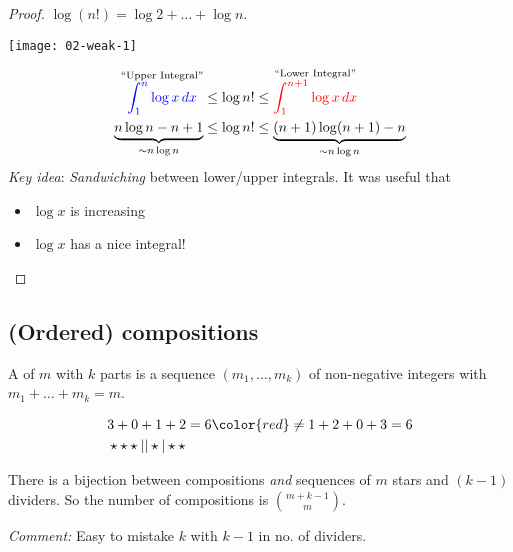 \begin{proof}
    $\log(n!) = \log 2 + \dots + \log n$.
    {\par \centering \texttt{[image: 02-weak-1]} \par}
    \begin{align*}
        \overset{``\text{Upper Integral}"}{\mathcolor{blue}{\int_{1}^{n} \log x \,dx}} \leq \log n! &\leq \overset{``\text{Lower Integral}"}{\mathcolor{red}{\int_{1}^{n + 1} \log x \,dx}} \\
        \underbrace{n \log n - n + 1}_{\sim n \log n} \leq \log n! &\leq \underbrace{(n + 1)\log(n+1) - n}_{\sim n \log n}
    \end{align*} 
    \emph{Key idea}: \emph{Sandwiching} between lower/upper integrals. It was useful that
    \begin{itemize}
        \item $\log x$ is increasing
        \item $\log x$ has a nice integral!
    \end{itemize} 
\end{proof}

\subsection{(Ordered) compositions} \label{Ordered compositions}

\begin{definition}[Composition]
    A  of $m$ with $k$ parts is a sequence $(m_1, \dots, m_k)$ of non-negative integers with $m_1 + \dots + m_k = m$.
\end{definition} 
\begin{example}
    \begin{align*}
        &3 + 0 + 1 + 2 = 6 \color{red} \neq 1 + 2 + 0 + 3 = 6 \\
        &\star \star \star | | \star | \star \star
    \end{align*} 
\end{example} 

There is a bijection between compositions \emph{and} sequences of $m$ stars and $(k - 1)$ dividers.
So the number of compositions is $\binom{m + k -1}{m}$.

\emph{Comment:} Easy to mistake $k$ with $k - 1$ in no. of dividers.